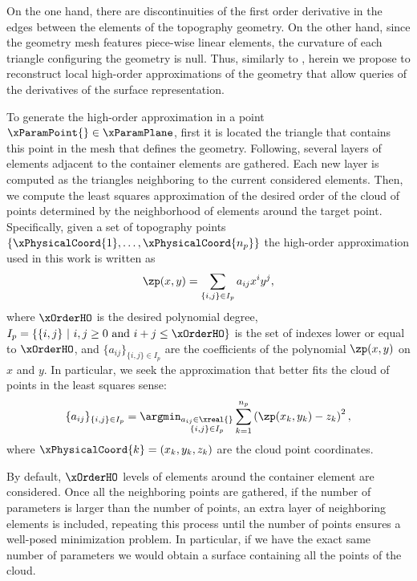 \documentclass[1p]{elsarticle}
\begin{document}
On the one hand, there are discontinuities of the first order derivative in the edges between the elements of the topography geometry. On the other hand, since the  geometry mesh features piece-wise linear elements, the curvature of each triangle configuring the geometry is null.
Thus, similarly to \cite{frey2000surface,frey2003surface},
herein we propose to reconstruct local high-order approximations of the geometry that allow queries of the derivatives of the surface representation.

To generate the high-order approximation in a point $\xParamPoint{}\in\xParamPlane$,  first it is located the triangle that contains this point in the  mesh that defines the geometry. Following, 
several layers of elements adjacent to the container elements are gathered.
Each new layer is computed as the triangles neighboring to the current considered elements. Then, we compute the least squares approximation of the desired order of the cloud of points determined by the neighborhood of elements around the target point. Specifically, given a set of topography points $\lbrace\xPhysicalCoord{1},\ldots,\xPhysicalCoord{n_p}\rbrace$ the high-order approximation used in this work is written as%
\begin{equation}
\zp(x,y) = 
\sum_{\{i,j\}\in I_p} a_{ij}x^i y^j,
\label{eq:zp}
\end{equation}
where  
$\xOrderHO$ is the desired polynomial degree, 
$I_p=\{  \{i,j\} \ |\ i,j\ge 0 \text{ and } i+j\leq \xOrderHO\}$ is the set of indexes lower or equal to $\xOrderHO$,
and $\{a_{ij}\}_{\{i,j\}\in I_p}$ are the coefficients of the polynomial  $\zp(x,y) $ on $x$ and $y$.
In particular, we seek the approximation that better fits the cloud of points in the least squares sense:
\begin{equation}
\label{eq:leasSquaresZ}
\{a_{ij}\}_{\{i,j\}\in I_p}=
\argmin_{
	\substack{
		a_{ij}\in\xreal{} \\
		\{i,j\}\in I_p}}
\sum_{k=1}^{n_p} 
\left(
\zp(x_k,y_k) - z_k 
\right)^2
,
\end{equation}
where $\xPhysicalCoord{k}=(x_k,y_k,z_k)$ are the cloud point coordinates.

By default, $\xOrderHO$ levels of elements around the container element are considered. Once all the neighboring points are gathered, 
if the number of parameters is larger than the number of points,
an extra layer of neighboring elements is included, repeating this process until the number of points ensures a well-posed minimization problem. In particular, if we have the exact same number of parameters we would obtain a surface containing all the points of the cloud.
\end{document}
